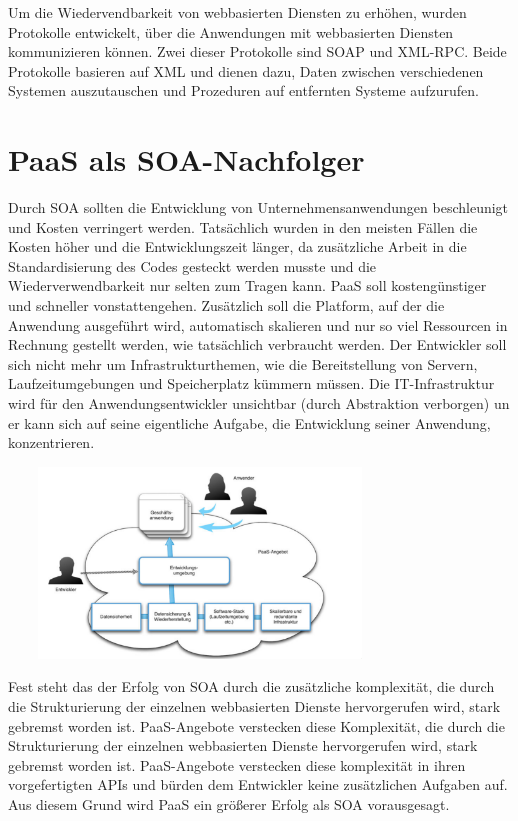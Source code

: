 \documentclass[a4paper,10pt]{article}
\begin{document}
\vspace{3mm}
Um die Wiedervendbarkeit von webbasierten Diensten zu erhöhen, wurden Protokolle entwickelt, über die Anwendungen mit webbasierten Diensten kommunizieren können. Zwei dieser Protokolle sind SOAP und XML-RPC. Beide Protokolle basieren auf XML und dienen dazu, Daten zwischen verschiedenen Systemen auszutauschen und Prozeduren auf entfernten Systeme aufzurufen.

\section{PaaS als SOA-Nachfolger}
Durch SOA sollten die Entwicklung von Unternehmensanwendungen beschleunigt und Kosten verringert werden. Tatsächlich wurden in den meisten Fällen die Kosten höher und die Entwicklungszeit länger, da zusätzliche Arbeit in die Standardisierung des Codes gesteckt werden musste und die Wiederverwendbarkeit nur selten zum Tragen kann. \newline
PaaS soll kostengünstiger und schneller vonstattengehen. Zusätzlich soll die Platform, auf der die Anwendung ausgeführt wird, automatisch skalieren und nur so viel Ressourcen in Rechnung gestellt werden, wie tatsächlich verbraucht werden. Der Entwickler soll sich nicht mehr um Infrastrukturthemen, wie die Bereitstellung von Servern, Laufzeitumgebungen und Speicherplatz kümmern müssen. Die IT-Infrastruktur wird für den Anwendungsentwickler unsichtbar (durch Abstraktion verborgen) un er kann sich auf seine eigentliche Aufgabe, die Entwicklung seiner Anwendung, konzentrieren.
\begin{center}
	\includegraphics[width=4in,height=2in]{paas.png}
\end{center}
Fest steht das der Erfolg von SOA durch die zusätzliche komplexität, die durch die Strukturierung der einzelnen webbasierten Dienste hervorgerufen wird, stark gebremst worden ist. PaaS-Angebote verstecken diese Komplexität, die durch die Strukturierung der einzelnen webbasierten Dienste hervorgerufen wird, stark gebremst worden ist. PaaS-Angebote verstecken diese komplexität in ihren vorgefertigten APIs und bürden dem Entwickler keine zusätzlichen Aufgaben auf. Aus diesem Grund wird PaaS ein größerer Erfolg als SOA vorausgesagt. \newline
\end{document}
